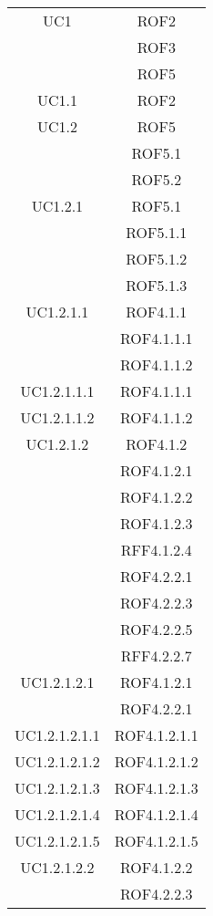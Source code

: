 \begin{longtable}{|c|c|}
\midrule
UC1
& ROF2\\
& ROF3\\
& ROF5\\

\midrule
UC1.1
& ROF2\\

\midrule
UC1.2
& ROF5\\
& ROF5.1\\
& ROF5.2\\

\midrule
UC1.2.1
& ROF5.1\\
& ROF5.1.1\\
& ROF5.1.2\\
& ROF5.1.3\\

\midrule
UC1.2.1.1
& ROF4.1.1\\
& ROF4.1.1.1\\
& ROF4.1.1.2\\

\midrule
UC1.2.1.1.1
& ROF4.1.1.1\\

\midrule
UC1.2.1.1.2
& ROF4.1.1.2\\

\midrule
UC1.2.1.2
& ROF4.1.2\\
& ROF4.1.2.1\\
& ROF4.1.2.2\\
& ROF4.1.2.3\\
& RFF4.1.2.4\\
& ROF4.2.2.1\\
& ROF4.2.2.3\\
& ROF4.2.2.5\\
& RFF4.2.2.7\\

\midrule
UC1.2.1.2.1
& ROF4.1.2.1\\
& ROF4.2.2.1\\

\midrule
UC1.2.1.2.1.1
& ROF4.1.2.1.1\\

\midrule
UC1.2.1.2.1.2
& ROF4.1.2.1.2\\

\midrule
UC1.2.1.2.1.3
& ROF4.1.2.1.3\\

\midrule
UC1.2.1.2.1.4
& ROF4.1.2.1.4\\

\midrule
UC1.2.1.2.1.5
& ROF4.1.2.1.5\\

\midrule
UC1.2.1.2.2
& ROF4.1.2.2\\
& ROF4.2.2.3\\


\end{longtable}
